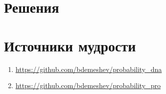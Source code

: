 \documentclass[12pt]{article}
\newcounter{problem}[section]
\theoremstyle{definition}
\begin{document}

\renewenvironment{solution}[1]{%
         \vskip .5cm plus 2cm minus 0.1cm%
         {\bfseries \hyperlink{problem:#1}{#1.}}%
}%
{%
}%



\section{Решения}



\section{Источники мудрости}


\begin{enumerate}
\item \url{https://github.com/bdemeshev/probability_dna}
\item \url{https://github.com/bdemeshev/probability_pro}
\end{enumerate}

\printbibliography[heading=none]
\end{document}
